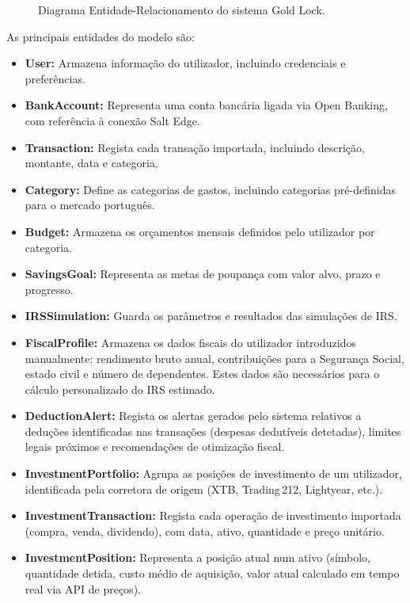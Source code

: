 \begin{figure}[H]
\centering

\caption{Diagrama Entidade-Relacionamento do sistema Gold Lock.}
\label{fig:modelo-er}
\end{figure}

As principais entidades do modelo são:

\begin{itemize}
    \item \textbf{User:} Armazena informação do utilizador, incluindo credenciais e preferências.
    \item \textbf{BankAccount:} Representa uma conta bancária ligada via Open Banking, com referência à conexão Salt Edge.
    \item \textbf{Transaction:} Regista cada transação importada, incluindo descrição, montante, data e categoria.
    \item \textbf{Category:} Define as categorias de gastos, incluindo categorias pré-definidas para o mercado português.
    \item \textbf{Budget:} Armazena os orçamentos mensais definidos pelo utilizador por categoria.
    \item \textbf{SavingsGoal:} Representa as metas de poupança com valor alvo, prazo e progresso.
    \item \textbf{IRSSimulation:} Guarda os parâmetros e resultados das simulações de \ac{IRS}.
    \item \textbf{FiscalProfile:} Armazena os dados fiscais do utilizador introduzidos manualmente: rendimento bruto anual, contribuições para a Segurança Social, estado civil e número de dependentes. Estes dados são necessários para o cálculo personalizado do \ac{IRS} estimado.
    \item \textbf{DeductionAlert:} Regista os alertas gerados pelo sistema relativos a deduções identificadas nas transações (despesas dedutíveis detetadas), limites legais próximos e recomendações de otimização fiscal.
    \item \textbf{InvestmentPortfolio:} Agrupa as posições de investimento de um utilizador, identificada pela corretora de origem (XTB, Trading\,212, Lightyear, etc.).
    \item \textbf{InvestmentTransaction:} Regista cada operação de investimento importada (compra, venda, dividendo), com data, ativo, quantidade e preço unitário.
    \item \textbf{InvestmentPosition:} Representa a posição atual num ativo (símbolo, quantidade detida, custo médio de aquisição, valor atual calculado em tempo real via API de preços).
\end{itemize}


